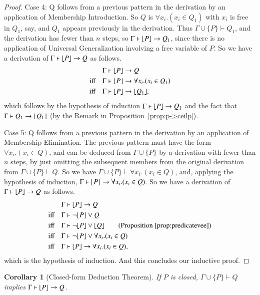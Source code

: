 \documentclass{article}
\theoremstyle{plain}
\newtheorem{cor}[thm]{Corollary}
\DeclarePairedDelimiter\floor{\lfloor}{\rfloor}
\begin{document}
\begin{proof}
Case 4: Q follows from a previous pattern in the derivation by an application of Membership Introduction. So $Q$ is $\forall x_i . (x_i \in Q_1)$ with $x_i$ is free in $Q_1$, say, and $Q_1$ appears previously in the derivation. Thus $\Gamma \cup \{P\} \vdash Q_1$, and the derivation has fewer than $n$ steps, so $\Gamma \vdash \floor*{P} \to Q_1$, since there is no application of Universal Generalization involving a free variable of $P$. So we have a derivation of $\Gamma \vdash \floor*{P} \to Q$ as follows.
\begin{align*}
\Gamma &\vdash \floor*{P} \to Q \\
{\text{iff} \quad} \Gamma &\vdash \floor*{P} \to \forall x_i . (x_i \in Q_1) \\
{\text{iff} \quad} \Gamma &\vdash \floor*{P} \to \floor*{Q_1}, \\
\end{align*}
which follows by the hypothesis of induction $\Gamma \vdash \floor*{P} \to Q_1$ and the fact that $\Gamma \vdash Q_1 \to \floor*{Q_1}$ (by the Remark in Proposition~\ref{prop:p->ceilp}).

Case 5: Q follows from a previous pattern in the derivation by an application of Membership Elimination. The previous pattern must have the form $\forall x_i . (x_i \in Q)$, and can be deduced from $\Gamma \cup \{P\}$ by a derivation with fewer than $n$ steps, by just omitting the subsequent members from the original derivation from $\Gamma \cup \{P\} \vdash Q$. So we have $\Gamma \cup \{P\} \vdash \forall x_i . (x_i \in Q)$, and, applying the hypothesis of induction, $\Gamma \vdash \floor*{P} \to \forall x_i . (x_i \in Q)$. So we have a derivation of $\Gamma \vdash \floor*{P} \to Q$ as follows.
\begin{align*}
\Gamma &\vdash \floor*{P} \to Q \\
{\text{iff} \quad} \Gamma &\vdash \neg \floor*{P} \vee Q \\
{\text{iff} \quad} \Gamma &\vdash \neg \floor*{P} \vee \floor*{Q} \tag{Proposition~\ref{prop:predicatevee}} \\
{\text{iff} \quad} \Gamma &\vdash \neg \floor*{P} \vee \forall x_i . (x_i \in Q) \\
{\text{iff} \quad} \Gamma &\vdash \floor*{P} \to \forall x_i . (x_i \in Q),
\end{align*}
which is the hypothesis of induction. And this concludes our inductive proof.
\end{proof}

\begin{cor}[Closed-form Deduction Theorem]
If $P$ is closed, $\Gamma \cup \{P\} \vdash Q$ implies $\Gamma \vdash \floor*{P} \to Q$.
\end{cor}
\end{document}
